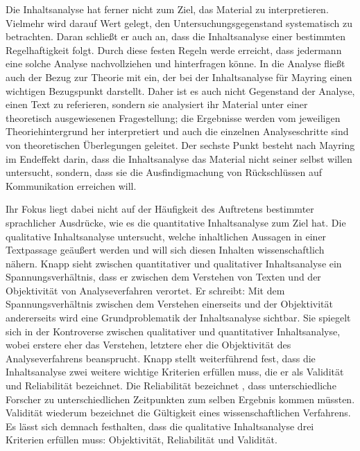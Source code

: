 Die Inhaltsanalyse hat ferner nicht zum Ziel, das Material zu interpretieren. 
Vielmehr wird darauf Wert gelegt, den Untersuchungsgegenstand systematisch zu betrachten. 
Daran schließt er auch an, dass die Inhaltsanalyse einer bestimmten Regelhaftigkeit folgt. 
Durch diese festen Regeln werde erreicht, dass jedermann eine solche Analyse nachvollziehen und hinterfragen könne. 
In die Analyse fließt auch der Bezug zur Theorie mit ein, der bei der Inhaltsanalyse für Mayring einen wichtigen Bezugspunkt darstellt. 
Daher ist es auch nicht Gegenstand der Analyse, einen Text zu referieren, sondern sie \glqq analysiert ihr Material unter einer theoretisch ausgewiesenen Fragestellung; die Ergebnisse werden vom jeweiligen Theoriehintergrund her interpretiert und auch die einzelnen Analyseschritte sind von theoretischen Überlegungen geleitet.\grqq{} \cite[S.\,12]{PM07}
 Der sechste Punkt besteht nach Mayring im Endeffekt darin, dass die Inhaltsanalyse das Material nicht seiner selbst willen untersucht, sondern, dass sie die Ausfindigmachung von Rückschlüssen auf Kommunikation erreichen will. 
 
Ihr Fokus liegt dabei nicht auf der Häufigkeit des Auftretens bestimmter sprachlicher Ausdrücke, wie es die quantitative Inhaltsanalyse zum Ziel hat. 
Die qualitative Inhaltsanalyse untersucht, welche inhaltlichen Aussagen in einer Textpassage geäußert werden und will sich diesen Inhalten wissenschaftlich nähern. 
Knapp sieht zwischen quantitativer und qualitativer Inhaltsanalyse ein Spannungsverhältnis, dass er zwischen dem Verstehen von Texten und der Objektivität von Analyseverfahren verortet. 
Er schreibt: \glqq Mit dem Spannungsverhältnis zwischen dem Verstehen einerseits und der Objektivität andererseits wird eine Grundproblematik der Inhaltsanalyse sichtbar. 
Sie spiegelt sich in der Kontroverse zwischen qualitativer und quantitativer Inhaltsanalyse, wobei erstere eher das Verstehen, letztere eher die Objektivität des Analyseverfahrens beansprucht.\grqq{} \cite[S.\,20f]{WK07}
Knapp stellt weiterführend fest, dass die Inhaltsanalyse zwei weitere wichtige Kriterien erfüllen muss, die er als Validität und Reliabilität bezeichnet. 
Die Reliabilität bezeichnet , dass unterschiedliche Forscher zu unterschiedlichen Zeitpunkten zum selben Ergebnis kommen müssten. 
Validität wiederum bezeichnet die Gültigkeit eines wissenschaftlichen Verfahrens. 
Es lässt sich demnach festhalten, dass die qualitative Inhaltsanalyse drei Kriterien erfüllen muss: Objektivität, Reliabilität und Validität.

